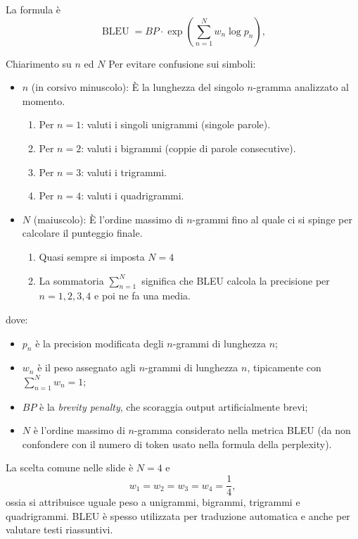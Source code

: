 La formula è
\begin{equation}
\boxed{\operatorname{BLEU}=BP\cdot\exp\left(\sum_{n=1}^{N}w_n\log p_n\right)},
\end{equation}
\begin{observation}{Chiarimento su $n$ ed $N$}
    Per evitare confusione sui simboli:
    \begin{itemize}
        \item $n$ (in corsivo minuscolo): È la lunghezza del singolo $n$-gramma analizzato al momento. 
        \begin{enumerate}
            \item Per $n=1$: valuti i singoli unigrammi (singole parole).   
            \item Per $n=2$: valuti i bigrammi (coppie di parole consecutive).
            \item Per $n=3$: valuti i trigrammi.
            \item Per $n=4$: valuti i quadrigrammi. 
        \end{enumerate}
        \item $N$ (maiuscolo): È l'ordine massimo di $n$-grammi fino al quale ci si spinge per calcolare il punteggio finale. 
        \begin{enumerate}
            \item Quasi sempre si imposta $N = 4$
            \item La sommatoria $\sum_{n=1}^N$ significa che BLEU calcola la precisione per $n=1, 2, 3, 4$ e poi ne fa una media.
        \end{enumerate}
    \end{itemize}
\end{observation}
dove:
\begin{itemize}
\item $p_n$ è la precision modificata degli $n$-grammi di lunghezza $n$;
\item $w_n$ è il peso assegnato agli $n$-grammi di lunghezza $n$, tipicamente con $\sum_{n=1}^{N}w_n=1$;
\item $BP$ è la \emph{brevity penalty}, che scoraggia output artificialmente brevi;
\item $N$ è l'ordine massimo di $n$-gramma considerato nella metrica BLEU (da non confondere con il numero di token usato nella formula della perplexity).
\end{itemize}

La scelta comune nelle slide è $N=4$ e
\begin{equation}
w_1=w_2=w_3=w_4=\frac14,
\end{equation}
ossia si attribuisce uguale peso a unigrammi, bigrammi, trigrammi e quadrigrammi. BLEU è spesso utilizzata per traduzione automatica e anche per valutare testi riassuntivi.


